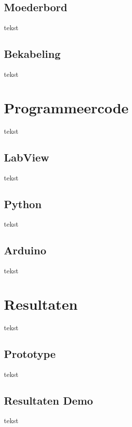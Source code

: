 \documentclass[kulak]{kulakarticle} %
\begin{document}
	
	\subsection{Moederbord}
	
	tekst
	
	
	\subsection{Bekabeling}
	
	tekst
	
	
	
	\section{Programmeercode}
	
	tekst
	
	
	\subsection{LabView}
	
	tekst
	
	
	\subsection{Python}
	
	tekst
	
	
	\subsection{Arduino}
	
	tekst
	
	
	
	\section{Resultaten}
	
	tekst
	
	
	\subsection{Prototype}
	
	tekst
	
	
	\subsection{Resultaten Demo}
	
	tekst
	
	
	
\end{document}
